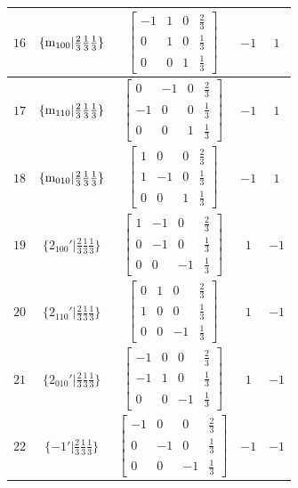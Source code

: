 \documentclass[fleqn,8pt]{jsarticle}
\begin{document}
\begin{longtable}{ccccc}
$ 16 $ & $ \{{\rm m}_{100}|\frac{2}{3} \frac{1}{3} \frac{1}{3}\} $ & $ \begin{bmatrix} -1 & 1 & 0 & \frac{2}{3} \\ 0 & 1 & 0 & \frac{1}{3} \\ 0 & 0 & 1 & \frac{1}{3} \end{bmatrix} $ & $ -1 $ & $ 1 $ \\ \hline
$ 17 $ & $ \{{\rm m}_{110}|\frac{2}{3} \frac{1}{3} \frac{1}{3}\} $ & $ \begin{bmatrix} 0 & -1 & 0 & \frac{2}{3} \\ -1 & 0 & 0 & \frac{1}{3} \\ 0 & 0 & 1 & \frac{1}{3} \end{bmatrix} $ & $ -1 $ & $ 1 $ \\ \hline
$ 18 $ & $ \{{\rm m}_{010}|\frac{2}{3} \frac{1}{3} \frac{1}{3}\} $ & $ \begin{bmatrix} 1 & 0 & 0 & \frac{2}{3} \\ 1 & -1 & 0 & \frac{1}{3} \\ 0 & 0 & 1 & \frac{1}{3} \end{bmatrix} $ & $ -1 $ & $ 1 $ \\ \hline
$ 19 $ & $ \{2{}_{100}{}'|\frac{2}{3} \frac{1}{3} \frac{1}{3}\} $ & $ \begin{bmatrix} 1 & -1 & 0 & \frac{2}{3} \\ 0 & -1 & 0 & \frac{1}{3} \\ 0 & 0 & -1 & \frac{1}{3} \end{bmatrix} $ & $ 1 $ & $ -1 $ \\ \hline
$ 20 $ & $ \{2{}_{110}{}'|\frac{2}{3} \frac{1}{3} \frac{1}{3}\} $ & $ \begin{bmatrix} 0 & 1 & 0 & \frac{2}{3} \\ 1 & 0 & 0 & \frac{1}{3} \\ 0 & 0 & -1 & \frac{1}{3} \end{bmatrix} $ & $ 1 $ & $ -1 $ \\ \hline
$ 21 $ & $ \{2{}_{010}{}'|\frac{2}{3} \frac{1}{3} \frac{1}{3}\} $ & $ \begin{bmatrix} -1 & 0 & 0 & \frac{2}{3} \\ -1 & 1 & 0 & \frac{1}{3} \\ 0 & 0 & -1 & \frac{1}{3} \end{bmatrix} $ & $ 1 $ & $ -1 $ \\ \hline
$ 22 $ & $ \{-1{}'|\frac{2}{3} \frac{1}{3} \frac{1}{3}\} $ & $ \begin{bmatrix} -1 & 0 & 0 & \frac{2}{3} \\ 0 & -1 & 0 & \frac{1}{3} \\ 0 & 0 & -1 & \frac{1}{3} \end{bmatrix} $ & $ -1 $ & $ -1 $ \\ \hline

\end{longtable}
\end{document}
